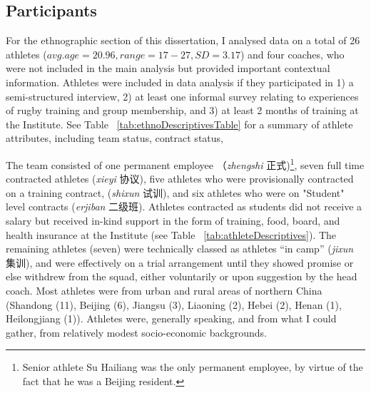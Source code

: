\begin{CJK}{UTF8}{gbsn}
\subsection{Participants}
For the ethnographic section of this dissertation, I analysed data on a total of 26 athletes ($avg. age = 20.96, range = 17-27, SD = 3.17$) and four coaches, who were not included in the main analysis but provided important contextual information.  Athletes were included in data analysis if they participated in 1) a semi-structured interview, 2) at least one informal survey relating to experiences of rugby training and group membership, and 3) at least 2 months of training at the Institute.  See Table ~\ref{tab:ethnoDescriptivesTable} for a summary of athlete attributes, including team status, contract status,



The team consisted of one permanent employee （\textit{zhengshi} 正式)\footnote{Senior athlete Su Hailiang was the only permanent employee, by virtue of the fact that he was a Beijing resident.}, seven full time contracted athletes (\textit{xieyi} 协议), five athletes who were provisionally contracted on a training contract, (\textit{shixun} 试训), and six athletes who were on "Student" level contracts (\textit{erjiban} 二级班).  Athletes contracted as students did not receive a salary but received in-kind support in the form of training, food, board, and health insurance at the Institute (see Table ~\ref{tab:athleteDescriptives}).  The remaining athletes (seven) were technically classed as athletes ``in camp'' (\textit{jixun} 集训), and were effectively on a trial arrangement until they showed promise or else withdrew from the squad, either voluntarily or upon suggestion by the head coach.  Most athletes were from urban and rural areas of northern China (Shandong (11), Beijing (6), Jiangsu (3), Liaoning (2), Hebei (2), Henan (1), Heilongjiang (1)). Athletes were, generally speaking, and from what I could gather, from relatively modest socio-economic backgrounds.


\end{CJK}
